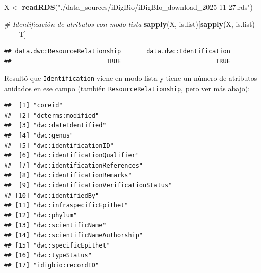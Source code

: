\documentclass[sn-apa,pdflatex]{sn-jnl}
\newenvironment{Shaded}{\begin{snugshade}}{\end{snugshade}}
\newcommand{\AttributeTok}[1]{\textcolor[rgb]{0.13,0.29,0.53}{#1}}
\newcommand{\CommentTok}[1]{\textcolor[rgb]{0.56,0.35,0.01}{\textit{#1}}}
\newcommand{\FunctionTok}[1]{\textcolor[rgb]{0.13,0.29,0.53}{\textbf{#1}}}
\newcommand{\NormalTok}[1]{#1}
\newcommand{\OtherTok}[1]{\textcolor[rgb]{0.56,0.35,0.01}{#1}}
\newcommand{\SpecialCharTok}[1]{\textcolor[rgb]{0.81,0.36,0.00}{\textbf{#1}}}
\newcommand{\StringTok}[1]{\textcolor[rgb]{0.31,0.60,0.02}{#1}}
\begin{document}
\begin{Shaded}
\begin{Highlighting}[]
\NormalTok{X }\OtherTok{\textless{}{-}} \FunctionTok{readRDS}\NormalTok{(}\StringTok{"./data\_sources/iDigBio/iDigBIo\_download\_2025{-}11{-}27.rds"}\NormalTok{)}
\end{Highlighting}
\end{Shaded}

\begin{Shaded}
\begin{Highlighting}[]
\CommentTok{\# Identificación de atributos con modo lista}
\FunctionTok{sapply}\NormalTok{(X, is.list)[}\FunctionTok{sapply}\NormalTok{(X, is.list) }\SpecialCharTok{==}\NormalTok{ T]}
\end{Highlighting}
\end{Shaded}

\begin{verbatim}
## data.dwc:ResourceRelationship       data.dwc:Identification 
##                          TRUE                          TRUE
\end{verbatim}

Resultó que \texttt{Identification} viene en modo lista y tiene un
número de atributos anidados en ese campo (también
\texttt{ResourceRelationship}, pero ver más abajo):

\begin{Shaded}
\end{Shaded}

\begin{verbatim}
##  [1] "coreid"                              
##  [2] "dcterms:modified"                    
##  [3] "dwc:dateIdentified"                  
##  [4] "dwc:genus"                           
##  [5] "dwc:identificationID"                
##  [6] "dwc:identificationQualifier"         
##  [7] "dwc:identificationReferences"        
##  [8] "dwc:identificationRemarks"           
##  [9] "dwc:identificationVerificationStatus"
## [10] "dwc:identifiedBy"                    
## [11] "dwc:infraspecificEpithet"            
## [12] "dwc:phylum"                          
## [13] "dwc:scientificName"                  
## [14] "dwc:scientificNameAuthorship"        
## [15] "dwc:specificEpithet"                 
## [16] "dwc:typeStatus"                      
## [17] "idigbio:recordID"
\end{verbatim}
\end{document}
